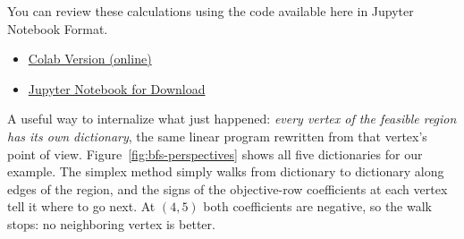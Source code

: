 \begin{resource}
You  can review these calculations using the code available here in Jupyter Notebook Format.
\begin{itemize}
\item \href{https://colab.research.google.com/drive/1kUWeNOVZByIoSWWUEUEFwwdFhAQvGcsG?usp=sharing}{Colab Version (online)}
\item \href{https://github.com/open-optimization/open-optimization-or-examples/blob/master/linear-programming/Simplex_Tableaus_From_Basis.ipynb}{Jupyter Notebook for Download}
\end{itemize}
\end{resource}

A useful way to internalize what just happened: \emph{every vertex of the feasible region has its own dictionary}, the same linear program rewritten from that vertex's point of view.  Figure~\ref{fig:bfs-perspectives} shows all five dictionaries for our example.  The simplex method simply walks from dictionary to dictionary along edges of the region, and the signs of the objective-row coefficients at each vertex tell it where to go next.  At $(4,5)$ both coefficients are negative, so the walk stops: no neighboring vertex is better.

